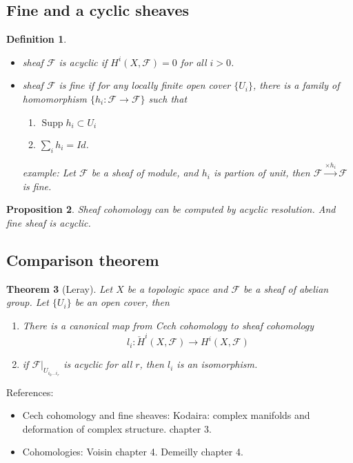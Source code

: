 \documentclass{article}
\newtheorem{definition}{Definition}[subsection]
\newtheorem{proposition}[definition]{Proposition}
\newtheorem{theorem}[definition]{Theorem}
\begin{document}
\subsection{Fine and a cyclic sheaves}
\begin{definition}
  \begin{itemize}
    \item sheaf $\mathcal{F}$ is acyclic if $H^{i}(X,\mathcal{F})=0$ for all $i>0$.
    \item sheaf $\mathcal{F}$ is fine if for any locally finite open cover $\{U_{i}\} $, there is a family of homomorphism $\{h_{i}:\mathcal{F} \to \mathcal{F} \} $ such that
      \begin{enumerate}
        \item $ \operatorname{Supp} h_{i} \subset U_{i}$
        \item $\sum_{i}h_{i}=Id$.
      \end{enumerate}
      example: Let $\mathcal{F}$ be a sheaf of module, and $h_{i}$ is partion of unit, then $\mathcal{F} \xrightarrow{ \times h_{i}} \mathcal{F}$ is fine. 
  \end{itemize}
\end{definition}
\begin{proposition}
  Sheaf cohomology can be computed by acyclic resolution. And fine sheaf is acyclic.
\end{proposition}
\subsection{Comparison theorem}
\begin{theorem}[Leray]
  Let $X$ be a topologic space and $\mathcal{F}$ be a sheaf of abelian group. Let  $\{U_{i}\} $ be an open cover, then
  \begin{enumerate}
    \item There is a canonical map from Cech cohomology to sheaf cohomology
      \[
       l_{i}: \check{H}^{i}(X,\mathcal{F})\to H^{i}(X,\mathcal{F})
      \]
    \item if $\mathcal{F}|_{U_{i_{0}\ldots i_{r}}}$ is acyclic for all $r$, then  $l_{i}$ is an isomorphism.
  \end{enumerate}
\end{theorem}
References:
\begin{itemize}
  \item Cech cohomology and fine sheaves: Kodaira: complex manifolds and deformation of complex structure. chapter 3.
  \item Cohomologies: Voisin chapter 4. Demeilly chapter 4.
\end{itemize}
\end{document}
